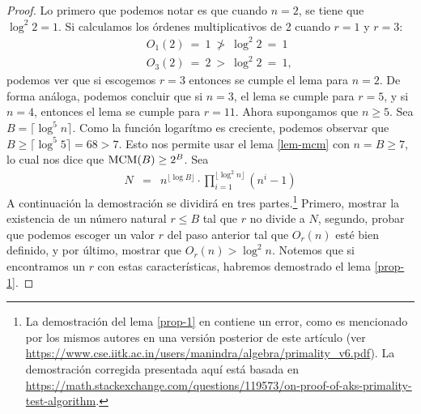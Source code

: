 	\begin{proof}
		Lo primero que podemos notar es que cuando $n=2$, se tiene que $\log^2 2 =1$. Si calculamos los órdenes multiplicativos de 2 cuando $r=1$ y $r=3$:
		\begin{eqnarray*}
			&&O_1(2) \ = \ 1 \ \not> \ \log ^2 2 \ =\ 1\\
			&&O_3(2) \ = \ 2  \ > \ \log ^2 2 \ =\ 1,
		\end{eqnarray*}
		podemos ver que si escogemos $r=3$ entonces se cumple el lema para $n=2$. De forma análoga, podemos concluir que si $n = 3$, el lema se cumple para $r = 5$, y si $n=4$, entonces el lema se cumple para $r= 11$.
		Ahora supongamos que $n \geq 5$. Sea $B = \lceil \log^5 n \rceil$. Como la función logarítmo es creciente, podemos observar que $B \geq \lceil \log ^5 5\rceil = 68 > 7$. Esto nos permite usar el lema \ref{lem-mcm} con $n = B\geq 7$, lo cual nos dice que ${\rm MCM}(B) \geq 2^{B}$.
		Sea
\begin{eqnarray*}
		N &=& n^{\lfloor\log B\rfloor} \cdot\prod_{i=1}^{\lfloor \log ^2n \rfloor} (n^i-1)
\end{eqnarray*}
A continuación la demostración se dividirá en tres partes.\footnote{La
  demostración del lema \ref{prop-1} en \cite{AKS04} contiene un
  error, como es mencionado por los mismos autores en una versión
  posterior de este artículo (ver \url{https://www.cse.iitk.ac.in/users/manindra/algebra/primality_v6.pdf}). La demostración corregida presentada aquí está basada en \url{https://math.stackexchange.com/questions/119573/on-proof-of-aks-primality-test-algorithm}.}
Primero, mostrar la existencia de un número natural
 $r\leq B$ tal que $r$ no divide a $N$,  segundo, probar que podemos escoger un valor $r$ del paso anterior tal que $O_r(n)$ esté bien definido, y por último, mostrar que $O_r(n)>\log ^2 n$. Notemos que si encontramos un $r$ con estas características, habremos demostrado el lema \ref{prop-1}.


\end{proof}
